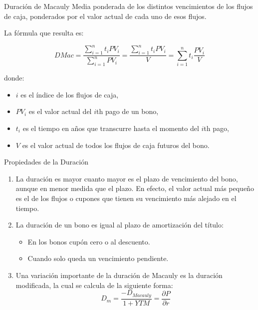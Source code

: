 \documentclass[11pt]{beamer}
\begin{document}
\begin{frame}{Duración de Macauly }
Media ponderada de los distintos vencimientos de los flujos de caja, ponderados por el valor actual de cada uno de esos flujos.

La fórmula que resulta es:

\begin{equation}
DMac = \frac{\sum_{i=1}^{n}{t_i PV_i}} {\sum_{i=1}^{n}{PV_i}}  = \frac{\sum_{i=1}^{n}{t_i PV_i}} {V}  = \sum_{i=1}^{n}t_i \frac{{PV_i}} {V}
\end{equation}
 

donde:
\begin{itemize}
	\item $i$ es el índice de los flujos de caja,
	\item $PV_i$ es el valor actual del $i$th pago de un bono,
	\item $t_i$ es el tiempo en años que transcurre hasta el momento del $i$th pago,
	\item $V$ es el valor actual de todos los flujos de caja futuros del bono.
\end{itemize}

\end{frame}

\begin{frame}{Propiedades de la Duración}
\begin{enumerate}
	\item La duración es mayor cuanto mayor es el plazo de vencimiento del bono, aunque en menor medida que el plazo. En efecto, el valor actual más pequeño es el de los flujos o cupones que tienen su vencimiento más alejado en el tiempo.
	\item La duración de un bono es igual al plazo de amortización del título:
	\begin{itemize}
		\item En los bonos cupón cero o al descuento.
		\item Cuando solo queda un vencimiento pendiente.
	\end{itemize}
	\item Una variación importante de la duración de Macauly es la duración modificada, la cual se calcula de la siguiente forma:
	\begin{equation}
	D_m=\frac{-D_{Macauly}}{1+YTM}=\frac{\partial P}{\partial r}
	\end{equation}
\end{enumerate}
\end{frame}
\end{document}
